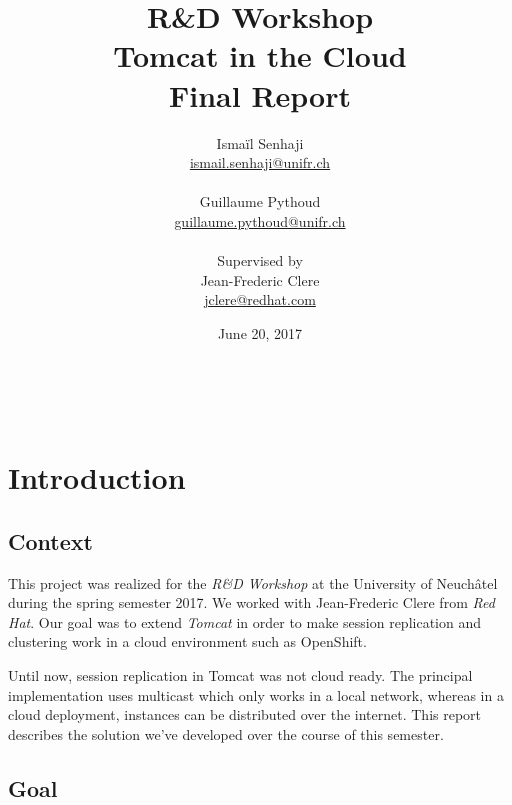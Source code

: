 \documentclass[11pt,a4paper]{article}
\title{%
    \textbf{R\&D Workshop} \\
    Tomcat in the Cloud
    \\
    \textbf{Final Report}
}
\author{%
    Ismaïl Senhaji \\
    \small \href{mailto:ismail.senhaji@unifr.ch}{ismail.senhaji@unifr.ch} \\
    \\
    Guillaume Pythoud \\
    \small \href{mailto:guillaume.pythoud@unifr.ch}{guillaume.pythoud@unifr.ch}
    \\
    \\
    Supervised by \\
    Jean-Frederic Clere \\
    \small \href{mailto:jclere@redhat.com}{jclere@redhat.com}
}
\date{June 20, 2017}
\begin{document}
\graphicspath{{fig/}}

\maketitle

\begin{figure}[b]
    \centering
    \\
\end{figure}

\newpage
\tableofcontents

\newpage



\section{Introduction}
\subsection{Context}
This project was realized for the \emph{R\&D Workshop} at the University of Neuchâtel during the spring semester 2017. We worked with Jean-Frederic Clere from \emph{Red Hat}\autocite{redhat}. Our goal was to extend \emph{Tomcat}\autocite{tomcat} in order to make session replication and clustering work in a cloud environment such as OpenShift\autocite{openshift}.

Until now, session replication in Tomcat was not cloud ready. The principal implementation uses multicast which only works in a local network, whereas in a cloud deployment, instances can be distributed over the internet. This report describes the solution we've developed over the course of this semester.

\subsection{Goal}
\end{document}
